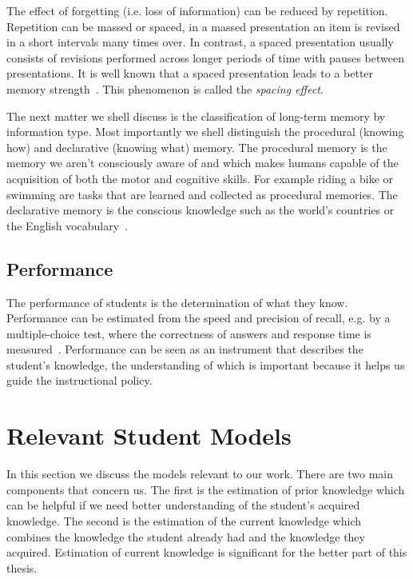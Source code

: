 The effect of forgetting (i.e. loss of information) can be reduced by repetition. Repetition can be massed or spaced, in a massed presentation an item is revised in a short intervals many times over. In contrast, a spaced presentation usually consists of revisions performed across longer periods of time with pauses between presentations. It is well known that a spaced presentation leads to a better memory strength~\cite{RichardE.Mayer2010}. This phenomenon is called the \textit{spacing effect}.

The next matter we shell discuss is the classification of long-term memory by information type. Most importantly we shell distinguish the procedural (knowing how) and declarative (knowing what) memory. The procedural memory is the memory we aren't consciously aware of and which makes humans capable of the acquisition of both the motor and cognitive skills. For example riding a bike or swimming are tasks that are learned and collected as procedural memories. The declarative memory is the conscious knowledge such as the world's countries or the English vocabulary~\cite{MichaelW.Eysenck2008}.

\subsection{Performance}

The performance of students is the determination of what they know. Performance can be estimated from the speed and precision of recall, e.g. by a multiple-choice test, where the correctness of answers and response time is measured~\cite{Lewis}. Performance can be seen as an instrument that describes the student's knowledge, the understanding of which is important because it helps us guide the instructional policy.

\section{Relevant Student Models}
\label{relevant-models}

In this section we discuss the models relevant to our work. There are two main components that concern us. The first is the estimation of prior knowledge which can be helpful if we need better understanding of the student's acquired knowledge. The second is the estimation of the current knowledge which combines the knowledge the student already had and the knowledge they acquired. Estimation of current knowledge is significant for the better part of this thesis.

